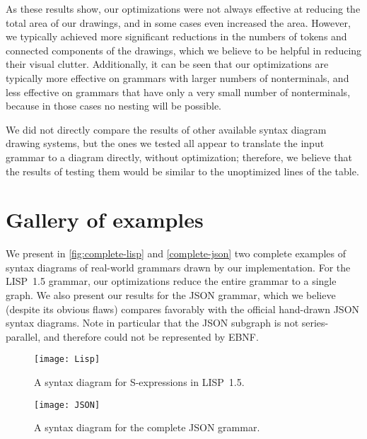 \documentclass[10pt]{llncs}
\begin{document}
As these results show, our optimizations were not always effective at reducing the total area of our drawings, and in some cases even increased the area. However, we typically achieved more significant reductions in the numbers of tokens and connected components of the drawings, which we believe to be helpful in reducing their visual clutter. Additionally, it can be seen that our optimizations are typically more effective on grammars with larger numbers of nonterminals, and less effective on grammars that have only a very small number of nonterminals, because in those cases no nesting will be possible.

We did not directly compare the results of other available syntax diagram drawing systems, but the ones we tested all appear to translate the input grammar to a diagram directly, without optimization; therefore, we believe that the results of testing them would be similar to the unoptimized lines of the table.

\section{Gallery of examples}

\renewcommand{\topfraction}{0.9}

We present in \autoref{fig:complete-lisp} and \autoref{complete-json} two complete examples of syntax diagrams of real-world grammars drawn by our implementation. For the LISP~1.5 grammar, our optimizations reduce the entire grammar to a single graph. We also present our results for the JSON grammar, which we believe (despite its obvious flaws) compares favorably with the official hand-drawn JSON syntax diagrams. Note in particular that the JSON  subgraph is not series-parallel, and therefore could not be represented by EBNF.

\begin{figure}[t]
\centering
\texttt{[image: Lisp]}
\caption{A syntax diagram for S-expressions in LISP~1.5.}
\label{fig:complete-lisp}
\end{figure}

\begin{figure}[t]
\centering
\texttt{[image: JSON]}
\caption{A syntax diagram for the complete JSON grammar.}
\label{complete-json}
\end{figure}



\end{document}
